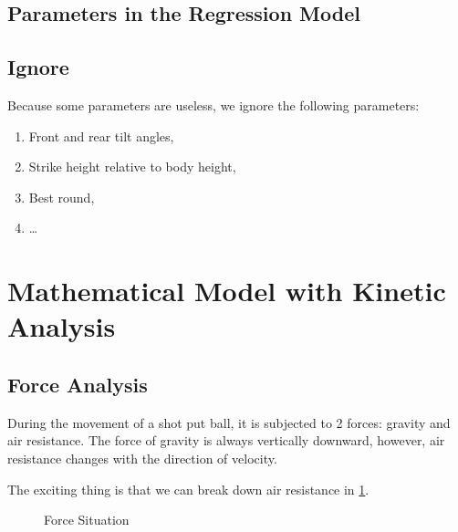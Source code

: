 \documentclass{article}
\begin{document}
\subsection{Parameters in the Regression Model}

\subsection{Ignore}

Because some parameters are useless, we ignore the following parameters:

\begin{enumerate}
    \item Front and rear tilt angles,
    \item Strike height relative to body height,
    \item Best round,
    \item \dots
\end{enumerate}

\section{Mathematical Model with Kinetic Analysis}

\label{section:mathematics-model}

\subsection{Force Analysis}

During the movement of a shot put ball, it is subjected to 2 forces: gravity and air resistance. The force of gravity is always vertically downward, however, air resistance changes with the direction of velocity.

The exciting thing is that we can break down air resistance in \ref{fig:force-situation}.

\begin{figure}[H]
    \centering
    \caption{Force Situation}
    \label{fig:force-situation}
\end{figure}
\end{document}
